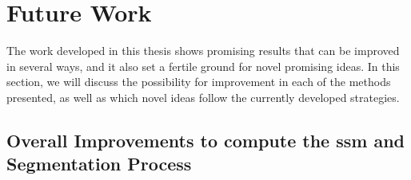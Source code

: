 
%


\chapter{Future Work}
\label{cha:future}



The work developed in this thesis shows promising results that can be improved in several ways, and it also set a fertile ground for novel promising ideas. In this section, we will discuss the possibility for improvement in each of the methods presented, as well as which novel ideas follow the currently developed strategies.


\section{Overall Improvements to compute the \gls{ssm} and Segmentation Process}


